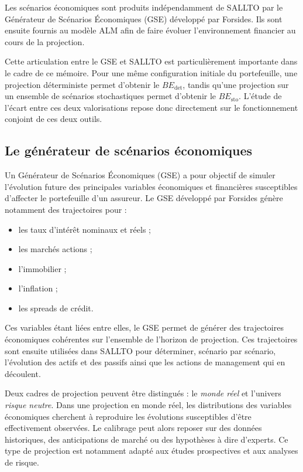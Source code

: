 Les scénarios économiques sont produits indépendamment de SALLTO par le Générateur de Scénarios Économiques (GSE) développé par Forsides. Ils sont ensuite fournis au modèle ALM afin de faire évoluer l'environnement financier au cours de la projection.

Cette articulation entre le GSE et SALLTO est particulièrement importante dans le cadre de ce mémoire. Pour une même configuration initiale du portefeuille, une projection déterministe permet d'obtenir le $BE_{\mathrm{det}}$, tandis qu'une projection sur un ensemble de scénarios stochastiques permet d'obtenir le $BE_{\mathrm{sto}}$. L'étude de l'écart entre ces deux valorisations repose donc directement sur le fonctionnement conjoint de ces deux outils.


\subsection{Le générateur de scénarios économiques}

Un Générateur de Scénarios Économiques (GSE) a pour objectif de simuler l'évolution future des principales variables économiques et financières susceptibles d'affecter le portefeuille d'un assureur. Le GSE développé par Forsides génère notamment des trajectoires pour :
\begin{itemize}[noitemsep,topsep=2pt]
    \item les taux d'intérêt nominaux et réels ;
    \item les marchés actions ;
    \item l'immobilier ;
    \item l'inflation ;
    \item les spreads de crédit.
\end{itemize}

Ces variables étant liées entre elles, le GSE permet de générer des trajectoires économiques cohérentes sur l'ensemble de l'horizon de projection. Ces trajectoires sont ensuite utilisées dans SALLTO pour déterminer, scénario par scénario, l'évolution des actifs et des passifs ainsi que les actions de management qui en découlent.

Deux cadres de projection peuvent être distingués : le \textit{monde réel} et l'univers \textit{risque neutre}. Dans une projection en monde réel, les distributions des variables économiques cherchent à reproduire les évolutions susceptibles d'être effectivement observées. Le calibrage peut alors reposer sur des données historiques, des anticipations de marché ou des hypothèses à dire d'experts. Ce type de projection est notamment adapté aux études prospectives et aux analyses de risque.

